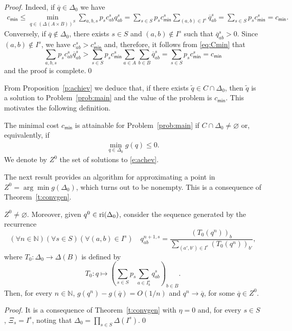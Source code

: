 \documentclass[smallextended,referee,envcountsect,]{svjour3}
\newcommand{\NN}{{\mathbb N}}
\begin{document}
\begin{proof}
Indeed, if $\overline{q}\in\Delta_0$
we have 
\begin{align}
{c_{\textsf{min}}\le }\min_{q\in(\Delta(A\times B))^S} 
\sum_{a,b,s}p_sc_{ab}^sq_{ab}^s 
= \sum_{s\in S}p_s c_{\textsf{min}}^s\!\!\!\!\sum_{(a,b)\in I^s}  
\overline{q}_{ab}^s = \sum_{s\in S}p_s c_{\textsf{min}}^s = 
c_{\textsf{min}}.\label{e:PrimalNoIC}
\end{align}
Conversely, if $\overline{q}\notin\Delta_0$, there exists 
$s\in S$ and $(a,b)\notin I^s$ such that $\overline{q}_{ab}^s>0$.
Since $(a,b)\notin I^s$, we have $c_{ab}^s>c_{\mathsf{min}}^s$ and, 
therefore,
it follows from \eqref{eq:Cmin} that
\begin{equation}
\sum_{a,b,s}p_sc_{ab}^s\overline{q}_{ab}^s>\sum_{s\in S}p_s 
c_{\textsf{min}}^s\sum_{a\in A}\sum_{b\in B}  
\overline{q}_{ab}^s = \sum_{s\in S}p_s c_{\textsf{min}}^s = 
c_{\textsf{min}}
\end{equation}
and the proof is complete.\qed
\end{proof}

From Proposition~\ref{p:achiev} we deduce that, if there exists 
$\widetilde{q}\in 
C\cap\Delta_0$, then $\widetilde{q}$ is a solution to 
Problem~\ref{prob:main} and the value of the problem is 
$c_{\mathsf{min}}$. This 
motivates the following definition.
\begin{definition}
\label{d:achiev}
The minimal cost $c_{\textsf{min}}$ is attainable for 
Problem~\ref{prob:main} if
$C\cap\Delta_0\neq\varnothing$ or,
equivalently, if
\begin{align}
\label{e:achev}\tag{$P_0$}
\min_{q\in \Delta_0}g(q)\le 0.
\end{align}
We denote by $Z^0$ the set 
of solutions to \eqref{e:achev}.
\end{definition}

The next result provides an algorithm for approximating a 
point in $Z^0=\arg\min g(\Delta_0)$, which turns out to be 
nonempty. This is a consequence of Theorem~\ref{t:convgen}.

\begin{proposition}
\label{prop:PF}
$Z^0\neq\varnothing$. { Moreover, given $q^0\in {\rm 
ri}(\Delta_0)$, 
consider the sequence generated 
by the recurrence 
\begin{equation}
\label{e:recurs0}
(\forall n\in\NN)(\forall s\in S)(\forall (a,b)\in I^s)\quad 
q_{ab}^{n+1,s}=
\frac{ 
(T_0(q^n))_b}{\sum\limits_{(a',b')\in 
I^s}(T_0(q^n))_{b'}}, 
\end{equation}
where $T_0\colon\Delta_0\to 
\Delta(B)$ is defined by 
\begin{equation}
\label{e:T0}
T_0\colon 
q\mapsto \left(\sum_{s\in 
S}p_s\sum_{a\in I_b^s}q_{ab}^s\right)_{b\in B}.
\end{equation}
Then, for every $n\in\NN$, $g(q^n)-g(\overline{q})=O(1/n)$ and 
$q^n\to \overline{q}$, for some $\overline{q}\in Z^0$.
}
\end{proposition}
\begin{proof} 
It is a consequence of Theorem~\ref{t:convgen} with $\eta=0$
and, for every $s\in S$, $\Xi_s={I^s}$, noting that 
$\Delta_0=\prod_{s\in S}\Delta({I^s})$.\qed
\end{proof}
\end{document}
